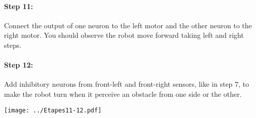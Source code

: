 \documentclass[12pt]{article}
\begin{document}
\paragraph{Step 11:} Connect the output of one neuron to the left motor and the other neuron to the right motor. You should observe the robot move forward taking left and right steps.

\paragraph{Step 12:} 

Add inhibitory neurons from front-left and front-right sensors, like in step 7, to make the robot turn when it perceive an obstacle from one side or the other.

\begin{center}
\texttt{[image: ../Etapes11-12.pdf]}
\end{center}
\end{document}

